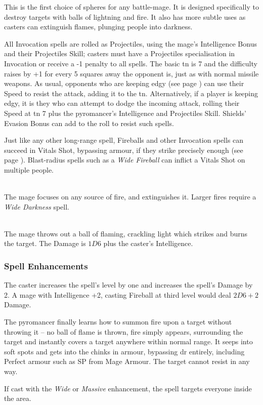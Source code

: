 \begin{multicols}{2}

\noindent
This is the first choice of spheres for any battle-mage.
It is designed specifically to destroy targets with balls of lightning and fire.
It also has more subtle uses as casters can extinguish flames, plunging people into darkness.

All Invocation spells are rolled as Projectiles, using the mage's Intelligence Bonus and their Projectiles Skill;
casters must have a Projectiles specialisation in Invocation or receive a -1 penalty to all spells.
The basic \gls{tn} is 7 and the difficulty raises by +1 for every 5 squares away the opponent is, just as with normal missile weapons.
As usual, opponents who are keeping edgy (see page \pageref{edgy}) can use their Speed to resist the attack, adding it to the \gls{tn}.
Alternatively, if a player is keeping edgy, it is they who can attempt to dodge the incoming attack, rolling their Speed at \gls{tn} 7 plus the pyromancer's Intelligence and Projectiles Skill.
Shields' Evasion Bonus can add to the roll to resist such spells.

Just like any other long-range spell, Fireballs and other Invocation spells can succeed in Vitals Shot, bypassing armour, if they strike precisely enough (see page \pageref{vitals}).
Blast-radius spells such as a \textit{Wide Fireball} can inflict a Vitals Shot on multiple people.

\spelllevel

\\
The mage focuses on any source of fire, and extinguishes it.
Larger fires require a \textit{Wide Darkness} spell.

\\
The mage throws out a ball of flaming, crackling light which strikes and burns the target. The Damage is $1D6$ plus the caster's Intelligence.

\subsubsection{Spell Enhancements}

The caster increases the spell's level by one and increases the spell's Damage by 2.  A mage with Intelligence +2, casting Fireball at third level would deal $2D6+2$ Damage.

The pyromancer finally learns how to summon fire upon a target without throwing it -- no ball of flame is thrown, fire simply appears, surrounding the target and instantly covers a target anywhere within normal range. It seeps into soft spots and gets into the chinks in armour, bypassing \gls{dr} entirely, including Perfect armour such as \gls{SP} from Mage Armour. The target cannot resist in any way.

If cast with the \textit{Wide} or \textit{Massive} enhancement, the spell targets everyone inside the area.

\end{multicols}

